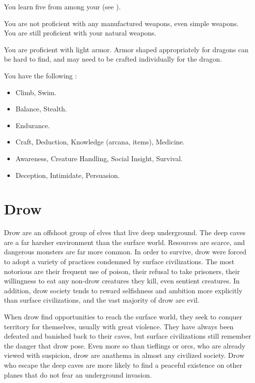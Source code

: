       You learn five  from among your  (see ).

      You are not proficient with any manufactured weapons, even simple weapons.
      You are still proficient with your natural weapons.

      You are proficient with light armor.
      Armor shaped appropriately for dragons can be hard to find, and may need to be crafted individually for the dragon.

      You have the following :
      \begin{itemize}
        \item {} Climb, Swim.
        \item {} Balance, Stealth.
        \item {} Endurance.
        \item {} Craft, Deduction, Knowledge (arcana, items), Medicine.
        \item {} Awareness, Creature Handling, Social Insight, Survival.
        \item {} Deception, Intimidate, Persuasion.
      \end{itemize}

\section{Drow}

  Drow are an offshoot group of elves that live deep underground.
  The deep caves are a far harsher environment than the surface world.
  Resources are scarce, and dangerous monsters are far more common.
  In order to survive, drow were forced to adopt a variety of practices condemned by surface civilizations.
  The most notorious are their frequent use of poison, their refusal to take prisoners, their willingness to eat any non-drow creatures they kill, even sentient creatures.
  In addition, drow society tends to reward selfishness and ambition more explicitly than surface civilizations, and the vast majority of drow are evil.

  When drow find opportunities to reach the surface world, they seek to conquer territory for themselves, usually with great violence.
  They have always been defeated and banished back to their caves, but surface civilizations still remember the danger that drow pose.
  Even more so than tieflings or orcs, who are already viewed with suspicion, drow are anathema in almost any civilized society.
  Drow who escape the deep caves are more likely to find a peaceful existence on other planes that do not fear an underground invasion.

